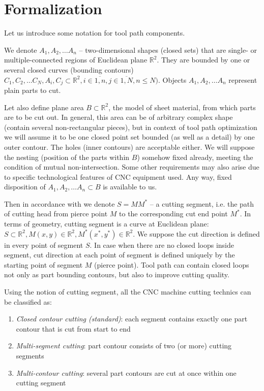 \documentclass{ifacconf}
\begin{document}
\section{Formalization}

Let us introduce some notation for tool path components.

We denote $A_1, A_2, \dots A_n$ -- two-dimensional shapes
(closed sets)
that are single- or multiple-connected
regions of Euclidean plane
$\mathbb R^2$.
They are bounded by one or several closed curves
(bounding contours)
$C_1, C_2, \dots C_N,
A_i, C_j \subset \mathbb R^2,
i \in \overline{1, n},
j \in \overline{1, N},
n \leqslant N)$.
Objects $A_1, A_2, \dots A_n$
represent plain parts to cut.

Let also define plane area
$B \subset \mathbb R^2$,
the model of
sheet material, from which parts are to be cut out.
In general,
this area can be of arbitrary complex shape
(contain several non-rectangular pieces),
but in context of tool path optimization
we will assume it to be
one closed point set bounded
(as well as a detail) by one outer contour.
The holes
(inner contours) are acceptable either.
We will suppose the nesting
(position of the parts within $B$)
somehow fixed already,
meeting the condition of
mutual non-intersection.
Some other requirements may also arise
due to specific technological features
of CNC equipment used.
Any way,
fixed disposition of
$A_1, A_2, \dots A_n \subset B$
is available to us.

Then
in accordance with \cite{Petunin2015Nov}
we denote $S=MM^*$ -- a cutting segment,
i.e. the path of cutting head
from pierce point $M$
to the corresponding cut end point $M^*$.
In terms of geometry,
cutting segment is a curve at Euclidean plane:
$S \subset \mathbb R^2,
M(x,y) \in \mathbb R^2,
M^*(x^*,y^*) \in \mathbb R^2$.
We suppose
the cut direction is defined
in every point of segment $S$.
In case when there are no
closed loops inside segment,
cut direction at each point of segment
is defined uniquely by the starting
point of segment $M$
(pierce point).
Tool path can contain closed loops
not only as part bounding contours,
but also to improve cutting quality.

Using the notion of cutting segment,
all the CNC machine cutting technics
can be classified as:
\begin{enumerate}
    \item{\textit{Closed contour cutting (standard)}}:
    each segment contains exactly one part contour
    that is cut from start to end
    \item{\textit{Multi-segment cutting}}:
    part contour consists of two (or more) cutting segments
    \item{\textit{Multi-contour cutting}}:
    several part contours are cut at once within one cutting segment
\end{enumerate}
\end{document}
